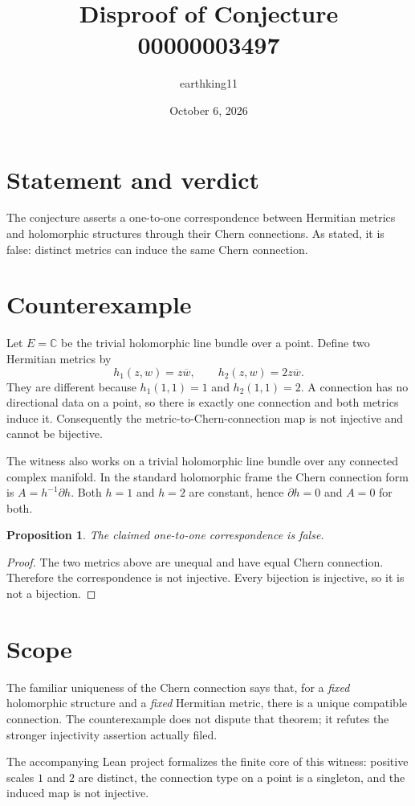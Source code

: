\documentclass[11pt]{article}
\title{Disproof of Conjecture 00000003497}
\author{earthking11}
\date{October 6, 2026}
\newtheorem{proposition}{Proposition}
\begin{document}
\maketitle
\section*{Statement and verdict}
The conjecture asserts a one-to-one correspondence between Hermitian metrics
and holomorphic structures through their Chern connections.  As stated, it is
false: distinct metrics can induce the same Chern connection.

\section*{Counterexample}
Let $E=\mathbb C$ be the trivial holomorphic line bundle over a point.  Define
two Hermitian metrics by
\[
 h_1(z,w)=z\overline w,\qquad h_2(z,w)=2z\overline w.
\]
They are different because $h_1(1,1)=1$ and $h_2(1,1)=2$.  A connection has
no directional data on a point, so there is exactly one connection and both
metrics induce it.  Consequently the metric-to-Chern-connection map is not
injective and cannot be bijective.

The witness also works on a trivial holomorphic line bundle over any connected
complex manifold.  In the standard holomorphic frame the Chern connection
form is $A=h^{-1}\partial h$.  Both $h=1$ and $h=2$ are constant, hence
$\partial h=0$ and $A=0$ for both.

\begin{proposition}
The claimed one-to-one correspondence is false.
\end{proposition}
\begin{proof}
The two metrics above are unequal and have equal Chern connection.  Therefore
the correspondence is not injective.  Every bijection is injective, so it is
not a bijection.
\end{proof}

\section*{Scope}
The familiar uniqueness of the Chern connection says that, for a \emph{fixed}
holomorphic structure and a \emph{fixed} Hermitian metric, there is a unique
compatible connection.  The counterexample does not dispute that theorem; it
refutes the stronger injectivity assertion actually filed.

The accompanying Lean project formalizes the finite core of this witness:
positive scales $1$ and $2$ are distinct, the connection type on a point is a
singleton, and the induced map is not injective.
\end{document}

